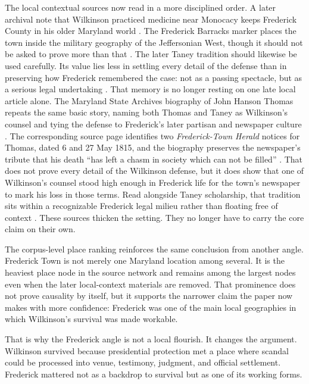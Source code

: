 The local contextual sources now read in a more disciplined order. A later archival note that Wilkinson practiced medicine near Monocacy keeps Frederick County in his older Maryland world \citep{clementsfindingaid,traceydern1987}. The Frederick Barracks marker places the town inside the military geography of the Jeffersonian West, though it should not be asked to prove more than that \citep{frederickbarracks,onuf2000}. The later Taney tradition should likewise be used carefully. Its value lies less in settling every detail of the defense than in preserving how Frederick remembered the case: not as a passing spectacle, but as a serious legal undertaking \citep{delaplaine1918}. That memory is no longer resting on one late local article alone. The Maryland State Archives biography of John Hanson Thomas repeats the same basic story, naming both Thomas and Taney as Wilkinson's counsel and tying the defense to Frederick's later partisan and newspaper culture \citep{thomasbio}. The corresponding source page identifies two \textit{Frederick-Town Herald} notices for Thomas, dated 6 and 27 May 1815, and the biography preserves the newspaper's tribute that his death ``has left a chasm in society which can not be filled'' \citep{thomassources,thomasbio}. That does not prove every detail of the Wilkinson defense, but it does show that one of Wilkinson's counsel stood high enough in Frederick life for the town's newspaper to mark his loss in those terms. Read alongside Taney scholarship, that tradition sits within a recognizable Frederick legal milieu rather than floating free of context \citep{swisher1935,smith1936,huebner2010}. These sources thicken the setting. They no longer have to carry the core claim on their own.

The corpus-level place ranking reinforces the same conclusion from another angle. Frederick Town is not merely one Maryland location among several. It is the heaviest place node in the source network and remains among the largest nodes even when the later local-context materials are removed. That prominence does not prove causality by itself, but it supports the narrower claim the paper now makes with more confidence: Frederick was one of the main local geographies in which Wilkinson's survival was made workable.

That is why the Frederick angle is not a local flourish. It changes the argument. Wilkinson survived because presidential protection met a place where scandal could be processed into venue, testimony, judgment, and official settlement. Frederick mattered not as a backdrop to survival but as one of its working forms.
